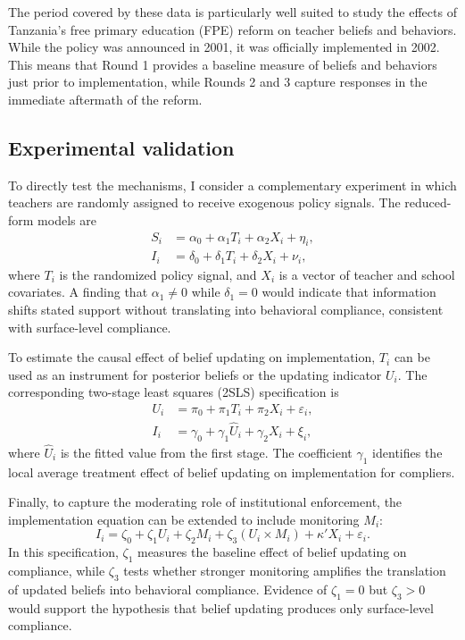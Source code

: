 \documentclass[hidelinks,12pt]{article}
\begin{document}
\begin{singlespace}
The period covered by these data is particularly well suited to study the effects of Tanzania's free primary education (FPE) reform on teacher beliefs and behaviors. While the policy was announced in 2001, it was officially implemented in 2002. This means that Round 1 provides a baseline measure of beliefs and behaviors just prior to implementation, while Rounds 2 and 3 capture responses in the immediate aftermath of the reform. 

\subsection{Experimental validation}  
To directly test the mechanisms, I consider a complementary experiment in which teachers are randomly assigned to receive exogenous policy signals. The reduced-form models are
\begin{align}
S_i &= \alpha_0 + \alpha_1 T_i + \alpha_2 X_i + \eta_i, \label{eq:stated}\\
I_i &= \delta_0 + \delta_1 T_i + \delta_2 X_i + \nu_i, \label{eq:behavior}
\end{align}
where $T_i$ is the randomized policy signal, and $X_i$ is a vector of teacher and school covariates. A finding that $\alpha_1\neq 0$ while $\delta_1=0$ would indicate that information shifts stated support without translating into behavioral compliance, consistent with surface-level compliance.

To estimate the causal effect of belief updating on implementation, $T_i$ can be used as an instrument for posterior beliefs or the updating indicator $U_i$. The corresponding two-stage least squares (2SLS) specification is
\begin{align}
U_i &= \pi_0 + \pi_1 T_i + \pi_2 X_i + \varepsilon_i, \label{eq:first-stage}\\
I_i &= \gamma_0 + \gamma_1 \widehat{U}_i + \gamma_2 X_i + \xi_i, \label{eq:second-stage}
\end{align}
where $\widehat{U}_i$ is the fitted value from the first stage. The coefficient $\gamma_1$ identifies the local average treatment effect of belief updating on implementation for compliers.

Finally, to capture the moderating role of institutional enforcement, the implementation equation can be extended to include monitoring $M_i$:
\begin{equation}
I_i = \zeta_0 + \zeta_1 U_i + \zeta_2 M_i + \zeta_3 (U_i \times M_i) + \kappa' X_i + \varepsilon_i.
\label{eq:monitoring}
\end{equation}
In this specification, $\zeta_1$ measures the baseline effect of belief updating on compliance, while $\zeta_3$ tests whether stronger monitoring amplifies the translation of updated beliefs into behavioral compliance. Evidence of $\zeta_1=0$ but $\zeta_3>0$ would support the hypothesis that belief updating produces only surface-level compliance.


\end{singlespace}
\end{document}
